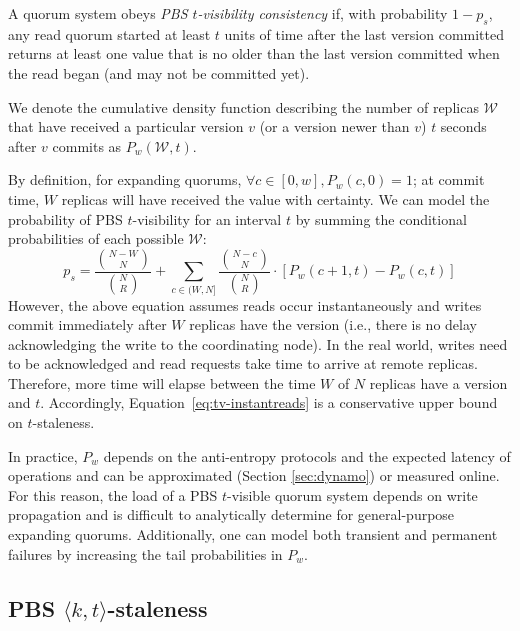 \documentclass{vldb}
\newcommand{\subsectionskip}{-0em}
\begin{document}
\begin{definition}
A quorum system obeys \textit{PBS $t$-visibility consistency} if, with
probability $1-p_{s}$, any read quorum started at least $t$ units
of time after the last version committed returns at least one value
that is no older than the last version committed when the read
began (and may not be committed yet).
\end{definition}

We denote the cumulative density function describing the number of
replicas $\mathcal{W}$ that have received a particular version $v$ (or
a version newer than $v$) $t$ seconds after $v$ commits as
$P_w(\mathcal{W}, t)$.

By definition, for expanding quorums, $\forall c \in [0, w], P_w(c,0)
= 1$; at commit time, $W$ replicas will have received the value with
certainty.  We can model the probability of PBS $t$-visibility for an
interval $t$ by summing the conditional probabilities of each possible
$\mathcal{W}$:
\begin{equation}
\label{eq:tv-instantreads}
p_{s} = \frac{{N-W \choose N}}{{N \choose R}}+\sum_{c\in(W, N]} \frac{{N-c \choose N}}{{N \choose R}}\cdot [P_w(c+1, t)-P_w(c,t)]
\end{equation}
However, the above equation assumes reads occur instantaneously and
writes commit immediately after $W$ replicas have the version (i.e.,
there is no delay acknowledging the write to the coordinating node).
In the real world, writes need to be acknowledged and read requests
take time to arrive at remote replicas.  Therefore, more time will elapse
between the time $W$ of $N$ replicas have a version and $t$.
Accordingly, Equation~\ref{eq:tv-instantreads} is a conservative upper
bound on $t$-staleness.

In practice, $P_w$ depends on the anti-entropy protocols and the
expected latency of operations and can be approximated (Section
\ref{sec:dynamo}) or measured online.  For this reason, the load of a
PBS $t$-visible quorum system depends on write propagation and is
difficult to analytically determine for general-purpose expanding
quorums.  Additionally, one can model both transient and permanent
failures by increasing the tail probabilities in $P_w$.


\vspace{\subsectionskip}\subsection{PBS $\langle k, t \rangle$-staleness}
\end{document}
